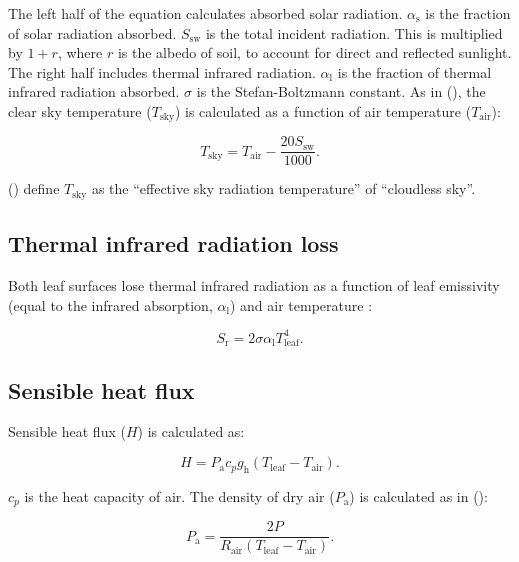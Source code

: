 \documentclass[11pt, oneside]{article}
\begin{document}
The left half of the equation calculates absorbed solar radiation. $\alpha_\mathrm{s}$ is the fraction of solar radiation absorbed. $S_\mathrm{sw}$ is the total incident radiation. This is multiplied by $1 + r$, where $r$ is the albedo of soil, to account for direct and reflected sunlight. The right half includes thermal infrared radiation. $\alpha_\mathrm{l}$ is the fraction of thermal infrared radiation absorbed. $\sigma$ is the Stefan-Boltzmann constant. As in \citeauthor{Okajima_etal_2012} (\citeyear{Okajima_etal_2012}), the clear sky temperature ($T_\mathrm{sky}$) is calculated as a function of air temperature ($T_\mathrm{air}$):

\begin{equation} \label{eq:Tsky}
  T_\mathrm{sky} = T_\mathrm{air} - \frac{20 S_\mathrm{sw}}{1000}.
\end{equation}

\citeauthor{Okajima_etal_2012} (\citeyear{Okajima_etal_2012}) define $T_\mathrm{sky}$ as the ``effective sky radiation temperature'' of ``cloudless sky''.

\subsection*{Thermal infrared radiation loss}

Both leaf surfaces lose thermal infrared radiation as a function of leaf emissivity (equal to the infrared absorption, $\alpha_\mathrm{l}$) and air temperature \citep{Foster_Smith_1986, Okajima_etal_2012}:

\begin{equation}
  S_\mathrm{r} = 2 \sigma \alpha_\mathrm{l} T_\mathrm{leaf} ^ 4.
\end{equation}
  
\subsection*{Sensible heat flux}
 
Sensible heat flux ($H$) is calculated as:

\begin{equation}
  H = P_\mathrm{a} c_p g_\mathrm{h} (T_\mathrm{leaf} - T_\mathrm{air}).
\end{equation}

$c_p$ is the heat capacity of air. The density of dry air ($P_\mathrm{a}$) is calculated as in \citeauthor{Foster_Smith_1986} (\citeyear{Foster_Smith_1986}):

\begin{equation}
  P_\mathrm{a} = \frac{2 P}{R_\mathrm{air} (T_\mathrm{leaf} - T_\mathrm{air})}.
\end{equation}
\end{document}
